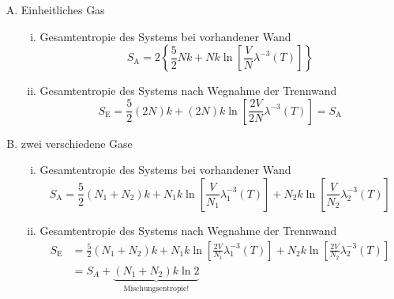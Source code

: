 \begin{enumerate}[A)]
    \item Einheitliches Gas
    \begin{enumerate}[i)]
        \item Gesamtentropie des Systems bei vorhandener Wand
        \begin{equation}
            S_\text{A} = 2 \left\{ \frac{5}{2} N k + N k \ln \left[ \frac{V}{N} \lambda^{-3}(T) \right]  \right\}
        \end{equation}
        \item Gesamtentropie des Systems nach Wegnahme der Trennwand
        \begin{equation}
            S_\text{E} = \frac{5}{2} (2N) k + (2N)k \ln \left[ \frac{2 V}{2 N} \lambda^{-3}(T) \right] = S_\text{A}
        \end{equation}
    \end{enumerate}
    \item zwei verschiedene Gase
    \begin{enumerate}[i)]
        \item Gesamtentropie des Systems bei vorhandener Wand
        \begin{equation}
            S_\text{A} = \frac{5}{2} \left( N_1 + N_2 \right) k + N_1 k \ln \left[ \frac{V}{N_1} \lambda_1^{-3}(T) \right] + N_2 k \ln \left[ \frac{V}{N_2} \lambda_2^{-3}(T) \right]
        \end{equation}
        \item Gesamtentropie des Systems nach Wegnahme der Trennwand
        \begin{equation}
            \begin{split}
                S_\text{E} &= \frac{5}{2} \left( N_1 + N_2 \right) k + N_1 k \ln \left[ \frac{2 V}{N_1} \lambda_1^{-3}(T) \right] + N_2 k \ln \left[ \frac{2 V}{N_2} \lambda_2^{-3}(T) \right] \\
                &= S_A + \underbrace{\left( N_1 + N_2 \right) k \ln 2}_{\text{Mischungsentropie!}}
            \end{split}
        \end{equation}
    \end{enumerate}
\end{enumerate}
